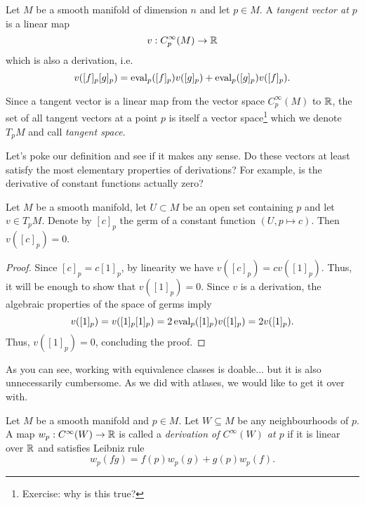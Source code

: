 \begin{definition}
  Let $M$ be a smooth manifold of dimension $n$ and let $p\in M$.
  A \emph{tangent vector at $p$} is a linear map
  \begin{equation}\label{def:tangentvector}
    v: C_p^\infty(M)\to\mathbb{R}
  \end{equation}
  which is also a derivation, i.e.
  \begin{equation}
    v([f]_p [g]_p) =
    \operatorname{eval}_p([f]_p)v([g]_p)
    + \operatorname{eval}_p([g]_p)v([f]_p).
  \end{equation}

  Since a tangent vector is a linear map from the vector space $C_p^\infty(M)$ to $\mathbb{R}$, the set of all tangent vectors at a point $p$ is itself a vector space\footnote{Exercise: why is this true?} which we denote $T_p M$ and call \emph{tangent space}.
\end{definition}

Let's poke our definition and see if it makes any sense.
Do these vectors at least satisfy the most elementary properties of derivations?
For example, is the derivative of constant functions actually zero?

\begin{lemma}\label{lem:f'0is0forconst}
  Let $M$ be a smooth manifold, let $U\subset M$ be an open set containing $p$ and let $v\in T_p M$.
  Denote by $[c]_p$ the germ of a constant function $(U, p \mapsto c)$.
  Then $v([c]_p) = 0$.
\end{lemma}
\begin{proof}
  Since $[c]_p = c [1]_p$, by linearity we have $v([c]_p) = c v([1]_p)$.
  Thus, it will be enough to show that $v([1]_p) = 0$.
  Since $v$ is a derivation, the algebraic properties of the space of germs imply
  \begin{equation}
    v([1]_p) = v([1]_p [1]_p) = 2 \operatorname{eval}_p([1]_p)v([1]_p) = 2 v([1]_p).
  \end{equation}
  Thus, $v([1]_p) = 0$, concluding the proof.
\end{proof}

As you can see, working with equivalence classes is doable... but it is also unnecessarily cumbersome.
As we did with atlases, we would like to get it over with.

\begin{definition}
  Let $M$ be a smooth manifold and $p\in M$.
  Let $W\subseteq M$ be any neighbourhoods of $p$.
  A map $w_p:C^\infty(W)\to\mathbb{R}$ is called a \emph{derivation of $C^\infty(W)$ at $p$} if it is linear over $\mathbb{R}$ and satisfies Leibniz rule
  \begin{equation}
    w_p(fg) = f(p)w_p(g) + g(p)w_p(f).
  \end{equation}
\end{definition}

